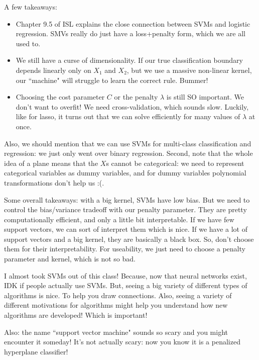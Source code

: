 A few takeaways:
\begin{itemize}
\item Chapter 9.5 of ISL explains the close connection between SVMs and logistic regression. SMVs really do just have a loss+penalty form, which we are all used to. 
\item We still have a curse of dimensionality. If our true classification boundary depends linearly only on $X_1$ and $X_2$, but we use a massive non-linear kernel, our ``machine" will struggle to learn the correct rule. Bummer!
\item Choosing the cost parameter $C$ or the penalty $\lambda$ is still SO important. We don't want to overfit! We need cross-validation, which sounds slow. Luckily, like for lasso, it turns out that we can solve efficiently for many values of $\lambda$ at once. 	
\end{itemize}

Also, we should mention that we can use SVMs for multi-class classification and regression: we just only went over binary regression. Second, note that the whole idea of a plane means that the $X$s cannot be categorical: we need to represent categorical variables as dummy variables, and for dummy variables polynomial transformations don't help us :(. 

Some overall takeaways: with a big kernel, SVMs have low bias. But we need to control the bias/variance tradeoff with our penalty parameter. They are pretty computationally efficient, and only a little bit interpretable. If we have few support vectors, we can sort of interpret them which is nice. If we have a lot of support vectors and a big kernel, they are basically a black box. So, don't choose them for their interpretability. For useability, we just need to choose a penalty parameter and kernel, which is not so bad.

I almost took SVMs out of this class! Because, now that neural networks exist, IDK if people actually use SVMs. But, seeing a big variety of different types of algorithms is nice. To help you draw connections. Also, seeing a variety of different motivations for algorithms might help you understand how new algorithms are developed! Which is important!

Also: the name ``support vector machine" sounds so scary and you might encounter it someday! It's not actually scary: now you know it is a penalized hyperplane classifier!






